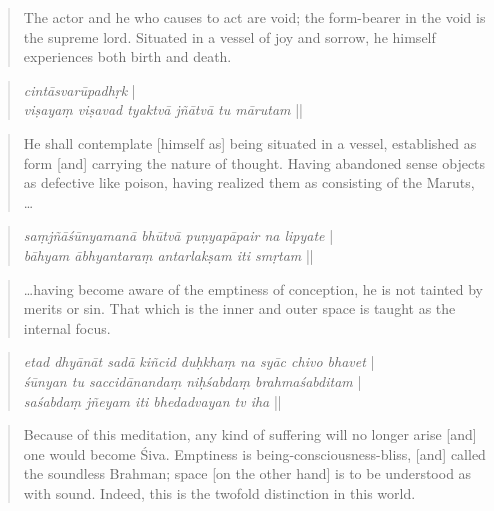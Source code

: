 \begin{quote}
The actor and he who causes to act are void; the form-bearer in the void is the supreme lord.
Situated in a vessel of joy and sorrow, he himself experiences both birth and death. 
\end{quote}
\begin{quote}
  \begin{ekdosis}
\textit{
cintāsvarūpadhṛk} |\\
\textit{viṣayaṃ viṣavad  tyaktvā jñātvā tu mārutam} ||
      \end{ekdosis}
    \end{quote}
    \begin{quote}
He shall contemplate [himself as] being situated in a vessel, established as form [and] carrying the nature of thought. 
Having abandoned sense objects as defective like poison, having realized them as consisting of the Maruts, \ldots 
\end{quote}
\begin{quote}
  \begin{ekdosis}
\textit{saṃjñāśūnyamanā bhūtvā puṇyapāpair na lipyate} |\\
\textit{bāhyam ābhyantaraṃ
 antarlakṣam iti smṛtam} ||
     \end{ekdosis}
    \end{quote}
\begin{quote}
\ldots having become aware of the emptiness of conception, he is not tainted by merits or sin.
That which is the inner and outer space is taught as the internal focus.
\end{quote}
\begin{quote}
  \begin{ekdosis}
\textit{etad dhyānāt sadā kiñcid duḥkhaṃ na syāc chivo bhavet} |\\
\textit{śūnyan tu saccidānandaṃ niḥśabdaṃ brahmaśabditam} |\\
\textit{saśabdaṃ jñeyam
iti bhedadvayan tv iha} ||
   \end{ekdosis}
 \end{quote}
    \begin{quote}
Because of this meditation, any kind of suffering will no longer arise [and] one would become Śiva.
Emptiness is being-consciousness-bliss, [and] called the soundless Brahman;
space [on the other hand] is to be understood as with sound. Indeed, this is the twofold distinction in this world.  
\end{quote}

